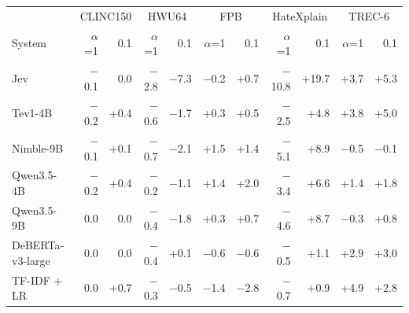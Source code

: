 \begin{tabular}{lrrrrrrrrrr}
\toprule
 & \multicolumn{2}{c}{CLINC150} & \multicolumn{2}{c}{HWU64} & \multicolumn{2}{c}{FPB} & \multicolumn{2}{c}{HateXplain} & \multicolumn{2}{c}{TREC-6} \\
\cmidrule(lr){2-3} \cmidrule(lr){4-5} \cmidrule(lr){6-7} \cmidrule(lr){8-9} \cmidrule(lr){10-11}
System & $\alpha$=1 & 0.1 & $\alpha$=1 & 0.1 & $\alpha$=1 & 0.1 & $\alpha$=1 & 0.1 & $\alpha$=1 & 0.1 \\
\midrule
Jev & $-$0.1 & 0.0 & $-$2.8 & $-$7.3 & $-$0.2 & +0.7 & $-$10.8 & +19.7 & +3.7 & +5.3 \\
Tev1-4B & $-$0.2 & +0.4 & $-$0.6 & $-$1.7 & +0.3 & +0.5 & $-$2.5 & +4.8 & +3.8 & +5.0 \\
Nimble-9B & $-$0.1 & +0.1 & $-$0.7 & $-$2.1 & +1.5 & +1.4 & $-$5.1 & +8.9 & $-$0.5 & $-$0.1 \\
Qwen3.5-4B & $-$0.2 & +0.4 & $-$0.2 & $-$1.1 & +1.4 & +2.0 & $-$3.4 & +6.6 & +1.4 & +1.8 \\
Qwen3.5-9B & 0.0 & 0.0 & $-$0.4 & $-$1.8 & +0.3 & +0.7 & $-$4.6 & +8.7 & $-$0.3 & +0.8 \\
DeBERTa-v3-large & 0.0 & 0.0 & $-$0.4 & +0.1 & $-$0.6 & $-$0.6 & $-$0.5 & +1.1 & +2.9 & +3.0 \\
TF-IDF + LR & 0.0 & +0.7 & $-$0.3 & $-$0.5 & $-$1.4 & $-$2.8 & $-$0.7 & +0.9 & +4.9 & +2.8 \\
\bottomrule
\end{tabular}
